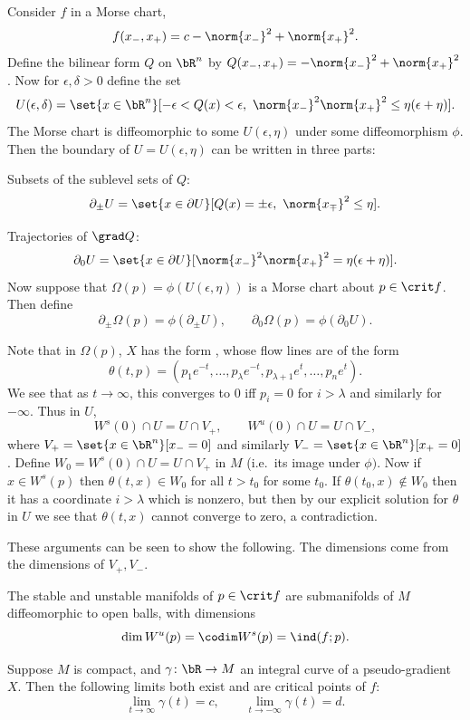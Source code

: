 \edefn

Consider $f$ in a Morse chart,
$$ f(x_-,x_+) = c - \norm{x_-}^2 + \norm{x_+}^2 . $$
Define the bilinear form $Q$ on $\bR^n$ by $Q(x_-,x_+)=-\norm{x_-}^2+\norm{x_+}^2$.
Now for $\epsilon,\delta>0$ define the set
$$ U(\epsilon,\delta) = \set{x\in\bR^n}[-\epsilon<Q(x)<\epsilon,\ \norm{x_-}^2\norm{x_+}^2\leq\eta(\epsilon+\eta)] . $$
The Morse chart is diffeomorphic to some $U(\epsilon,\eta)$ under some diffeomorphism $\phi$.
Then the boundary of $U=U(\epsilon,\eta)$ can be written in three parts:
\benum
    \item Subsets of the sublevel sets of $Q$:
    $$ \partial_\pm U = \set{x\in\partial U}[Q(x)=\pm\epsilon,\ \norm{x_\mp}^2\leq\eta] . $$
    \item Trajectories of $\grad Q$:
    $$ \partial_0U = \set{x\in\partial U}[\norm{x_-}^2\norm{x_+}^2=\eta(\epsilon+\eta)] . $$
\eenum
Now suppose that $\Omega(p)=\phi(U(\epsilon,\eta))$ is a Morse chart about $p\in\crit f$.
Then define
$$ \partial_\pm\Omega(p) = \phi(\partial_\pm U),\qquad \partial_0\Omega(p) = \phi(\partial_0U) . $$

Note that in $\Omega(p)$, $X$ has the form , whose flow lines are of the form
$$ \theta(t,p) = (p_1e^{-t},\dots,p_\lambda e^{-t},p_{\lambda+1}e^t,\dots,p_ne^t) . $$
We see that as $t\to\infty$, this converges to $0$ iff $p_i=0$ for $i>\lambda$ and similarly for $-\infty$.
Thus in $U$,
$$ W^s(0)\cap U = U\cap V_+,\qquad W^u(0)\cap U = U\cap V_- , $$
where $V_+=\set{x\in\bR^n}[x_-=0]$ and similarly $V_-=\set{x\in\bR^n}[x_+=0]$.
Define $W_0=W^s(0)\cap U=U\cap V_+$ in $M$ (i.e.\ its image under $\phi)$.
Now if $x\in W^s(p)$ then $\theta(t,x)\in W_0$ for all $t>t_0$ for some $t_0$.
If $\theta(t_0,x)\notin W_0$ then it has a coordinate $i>\lambda$ which is nonzero, but then by our explicit
solution for $\theta$ in $U$ we see that $\theta(t,x)$ cannot converge to zero, a contradiction.

These arguments can be seen to show the following.
The dimensions come from the dimensions of $V_+,V_-$.

\bprop

    The stable and unstable manifolds of $p\in\crit f$ are submanifolds of $M$ diffeomorphic to open
    balls, with dimensions
    $$ \dim W^u(p) = \codim W^s(p) = \ind(f;p) . $$

\eprop

\bprop

    Suppose $M$ is compact, and $\gamma\colon\bR\to M$ an integral curve of a pseudo-gradient $X$.
    Then the following limits both exist and are critical points of $f$:
    $$ \lim_{t\to\infty}\gamma(t) = c,\qquad \lim_{t\to-\infty}\gamma(t) = d . $$

